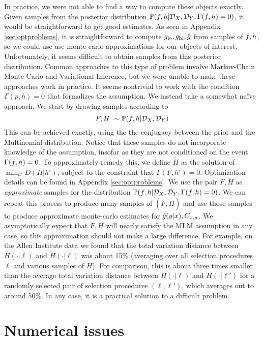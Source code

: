 In practice, we were not able to find a way to compute these objects exactly.  Given samples from the posterior distribution $\mathbb{P}(f,h| {\mathcal{D}_X},{\mathcal{D}_Y},\Gamma(f,h)=0)$, it would be straightforward to get good estimates.  As seen in Appendix \ref{sec:optproblems}, it is straightforward to compute $g_{\mathrm{lo}},g_{\mathrm{hi}},\hat {g}$ from samples of $f,h$, so we could use use monte-carlo approximations for our objects of interest.  Unfortunately, it seems difficult to obtain samples from this posterior distribution.   Common approaches to this type of problem involve Markov-Chain Monte Carlo and Variational Inference, but we were unable to make these approaches work in practice.  It seems nontrivial to work with the condition $\Gamma(p,h)=0$ that formalizes the \MLM{} assumption.  We instead take a somewhat na\"ive approach.  We start by drawing samples according to
\[
F,H ~ \sim \mathbb{P}(f,h | {\mathcal{D}_X},{\mathcal{D}_Y})
\]
This can be achieved exactly, using the the conjugacy between the prior and the Multinomial distribution.  Notice that these samples do not incorporate knowledge of the \MLM{} assumption, insofar as they are not conditioned on the event $\Gamma(f,h)=0$.  To approximately remedy this, we define $\tilde H$ as the solution of $\min_{h'}D(H|h')$, subject to the constraint that $\Gamma(F,h')=0$.  Optimization details can be found in Appendix \ref{sec:optproblems}.  We use the pair $F,\tilde H$ as \emph{approximate} samples for the distribution $\mathbb{P}(f,h| {\mathcal{D}_X},{\mathcal{D}_Y},\Gamma(f,h)=0)$.  We can repeat this process to produce many samples of $(F,\tilde H)$ and use those samples to produce approximate monte-carlo estimates for $\hat {g}(y|x),C_{x,y}$.  We asymptotically expect that $F,H$ will nearly satisfy the MLM assumption in any case, so this approximation should not make a large difference.  For example, on the Allen Institute data we found that the total variation distance between $H(\cdot|\ell)$ and $\tilde H(\cdot|\ell)$ was about 15\% (averaging over all selection procedures $\ell$ and various samples of $H$).  For comparison, this is about three times smaller than the average total variation distance between $H(\cdot|\ell)$ and $H(\cdot|\ell')$ for a randomly selected pair of selection procedures $(\ell,\ell')$, which averages out to around 50\%.   In any case, it is a practical solution to a difficult problem.

\section{Numerical issues}


